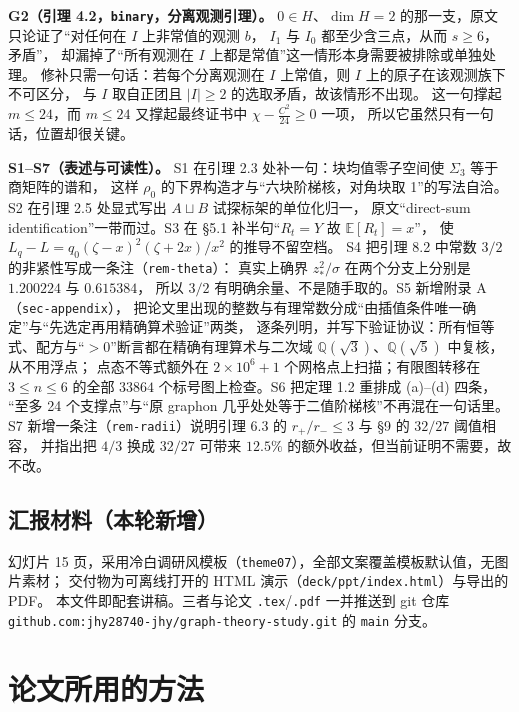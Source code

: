 \documentclass[UTF8,11pt]{ctexart}
\newcommand{\E}{\mathbb{E}}
\newcommand{\file}[1]{\texttt{#1}}
\begin{document}
\textbf{G2（引理 4.2，\file{binary}，分离观测引理）。}
$0\in H$、$\dim H=2$ 的那一支，原文只论证了``对任何在 $I$ 上非常值的观测 $b$，
$I_1$ 与 $I_0$ 都至少含三点，从而 $s\ge6$，矛盾''，
却漏掉了``所有观测在 $I$ 上都是常值''这一情形本身需要被排除或单独处理。
修补只需一句话：若每个分离观测在 $I$ 上常值，则 $I$ 上的原子在该观测族下不可区分，
与 $I$ 取自正团且 $|I|\ge2$ 的选取矛盾，故该情形不出现。
这一句撑起 $m\le24$，而 $m\le24$ 又撑起最终证书中 $\chi-\frac{C^2}{24}\ge0$ 一项，
所以它虽然只有一句话，位置却很关键。

\textbf{S1--S7（表述与可读性）。}
S1 在引理 2.3 处补一句：块均值零子空间使 $\Sigma_3$ 等于商矩阵的谱和，
这样 $\rho_0$ 的下界构造才与``六块阶梯核，对角块取 1''的写法自洽。
S2 在引理 2.5 处显式写出 $A\sqcup B$ 试探标架的单位化归一，
原文``direct-sum identification''一带而过。S3 在 \S5.1 补半句``$R_t=Y$ 故 $\E[R_t]=x$''，
使 $L_q-L=q_0(\zeta-x)^2(\zeta+2x)/x^2$ 的推导不留空档。
S4 把引理 8.2 中常数 $3/2$ 的非紧性写成一条注（\file{rem-theta}）：
真实上确界 $z_*^2/\sigma$ 在两个分支上分别是 $1.200224$ 与 $0.615384$，
所以 $3/2$ 有明确余量、不是随手取的。S5 新增附录 A（\file{sec-appendix}），
把论文里出现的整数与有理常数分成``由插值条件唯一确定''与``先选定再用精确算术验证''两类，
逐条列明，并写下验证协议：所有恒等式、配方与``$>0$''断言都在精确有理算术与二次域
$\mathbb Q(\sqrt3)$、$\mathbb Q(\sqrt5)$ 中复核，从不用浮点；
点态不等式额外在 $2\times10^6+1$ 个网格点上扫描；有限图转移在 $3\le n\le6$ 的全部
$33864$ 个标号图上检查。S6 把定理 1.2 重排成 (a)--(d) 四条，
``至多 24 个支撑点''与``原 graphon 几乎处处等于二值阶梯核''不再混在一句话里。
S7 新增一条注（\file{rem-radii}）说明引理 6.3 的 $r_+/r_-\le3$ 与 \S9 的 $32/27$ 阈值相容，
并指出把 $4/3$ 换成 $32/27$ 可带来 $12.5\%$ 的额外收益，但当前证明不需要，故不改。

\subsection{汇报材料（本轮新增）}

幻灯片 15 页，采用冷白调研风模板（\file{theme07}），全部文案覆盖模板默认值，无图片素材；
交付物为可离线打开的 HTML 演示（\file{deck/ppt/index.html}）与导出的 PDF。
本文件即配套讲稿。三者与论文 \file{.tex}/\file{.pdf} 一并推送到 git 仓库
\file{github.com:jhy28740-jhy/graph-theory-study.git} 的 \file{main} 分支。

\section{论文所用的方法}
\end{document}
